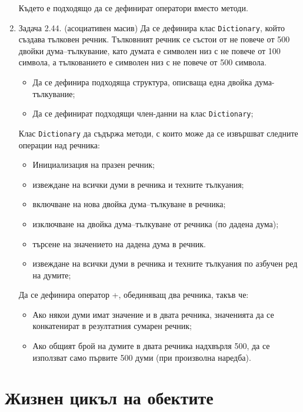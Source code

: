\begin{enumerate}
Където е подходящо да се дефинират оператори вместо методи.


\item Задача 2.44. \cite{sbornik2} (асоциативен масив) Да се дефинира клас \texttt{Dictionary}, който създава тълковен речник. Тълковният речник се състои от не повече от 500 двойки дума–тълкувание, като думата е символен низ с не повече от 100 символа, а тълкованието е символен низ с не повече от 500 символа.

\begin{itemize}
	\item Да се дефинира подходяща структура, описваща една двойка дума-тълкувание;
	\item Да се дефинират подходящи член-данни на клас \texttt{Dictionary};
\end{itemize}

Клас \texttt{Dictionary} да съдържа методи, с които може да се извършват следните операции над речника:

\begin{itemize}

\item Инициализация на празен речник;
\item извеждане на всички думи в речника и техните тълкуания;
\item включване на нова двойка дума–тълкуване в речника;
\item изключване на двойка дума–тълкуване от речника (по дадена дума);
\item търсене на значението на дадена дума в речник.
\item извеждане на всички думи в речника и техните тълкуания по азбучен ред на думите;
\end{itemize}

Да се дефинира оператор +, обединяващ два речника, такъв че:

\begin{itemize}
 \item Ако някои думи имат значение и в двата речника, значенията да се конкатенират в резултатния сумарен речник;
 \item Ако общият брой на думите в двата речника надхвърля 500, да се използват само първите 500 думи (при произволна наредба).
\end{itemize}


\end{enumerate}


\pagebreak

\clearpage\section {Жизнен цикъл на обектите}

